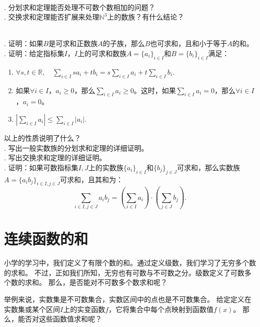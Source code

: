 \documentclass[12pt,UTF8]{ctexbook}
\begin{document}
\begin{sk}
    \mbox{} \\
    . 分划求和定理能否处理不可数个数相加的问题？\\
    . 交换求和定理能否扩展来处理$\mathbb{N}^3$上的数族？有什么结论？
\end{sk}

\begin{xt}
    \mbox{} \\
    . 证明：如果$B$是可求和正数族$A$的子族，那么$B$也可求和，且和小于等于$A$的和。\\
    . 证明：给定指标集$I$，$I$上的可求和数族$A = \{a_i\}_{i\in I}$和$B = \{b_i\}_{i\in I}$满足：
    \begin{enumerate}
        \item $\displaystyle \forall s, t\in\mathbb{R}, \quad \sum_{i\in I} sa_i + tb_i = s\sum_{i\in I} a_i + t \sum_{i\in I} b_i.$
        \item 如果$\forall i\in I$，$a_i \geqslant 0$，那么$\sum_{i\in I} a_i \geqslant 0$。这时，如果$\sum_{i\in I} a_i = 0$，那么$\forall i\in I$，$a_i = 0$。
        \item $\left| \sum_{i\in I} a_i \right| \leqslant \sum_{i\in I} |a_i|. $
    \end{enumerate}
    \indent 以上的性质说明了什么？\\
    . 写出一般实数族的分划求和定理的详细证明。\\
    . 写出交换求和定理的详细证明。\\
    . 证明：如果可数指标集$I,J$上的实数族$\{a_i\}_{i\in I}$和$\{b_j\}_{j\in J}$可求和，那么实数族$A = \{a_ib_j\}_{i\in I, j\in J}$可求和，且其和为：
    $$ \sum_{i\in I, j\in J} a_i b_j = \left(\sum_{i\in I} a_i\right) \cdot \left(\sum_{j\in J} b_j\right). $$
\end{xt}

\chapter{连续函数的和}

小学的学习中，我们定义了有限个数的和。通过定义级数，我们学习了无穷多个数的求和。
不过，正如我们所知，无穷也有可数与不可数之分。级数定义了可数多个数的求和。
那么，是否能对不可数多个数求和呢？

举例来说，实数集是不可数集合，实数区间中的点也是不可数集合。
给定定义在实数集或某个区间$I$上的实变函数$f$，它将集合中每个点映射到函数值$f(x)$。
那么，能否对这些函数值求和呢？
\end{document}
